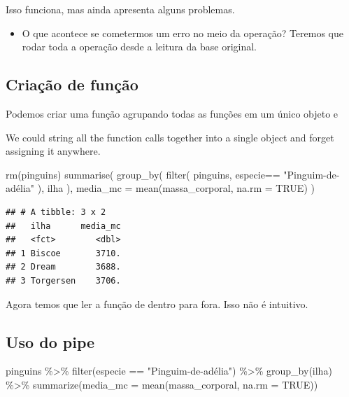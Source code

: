 \documentclass[
]{book}
\newenvironment{Shaded}{\begin{snugshade}}{\end{snugshade}}
\newcommand{\AttributeTok}[1]{\textcolor[rgb]{0.77,0.63,0.00}{#1}}
\newcommand{\ConstantTok}[1]{\textcolor[rgb]{0.00,0.00,0.00}{#1}}
\newcommand{\FunctionTok}[1]{\textcolor[rgb]{0.00,0.00,0.00}{#1}}
\newcommand{\NormalTok}[1]{#1}
\newcommand{\SpecialCharTok}[1]{\textcolor[rgb]{0.00,0.00,0.00}{#1}}
\newcommand{\StringTok}[1]{\textcolor[rgb]{0.31,0.60,0.02}{#1}}
\providecommand{\tightlist}{%
  \setlength{\itemsep}{0pt}\setlength{\parskip}{0pt}}
\begin{document}
Isso funciona, mas ainda apresenta alguns problemas.

\begin{itemize}
\tightlist
\item
  O que acontece se cometermos um erro no meio da operação? Teremos que rodar
  toda a operação desde a leitura da base original.
\end{itemize}

\hypertarget{criauxe7uxe3o-de-funuxe7uxe3o}{%
\subsection{Criação de função}\label{criauxe7uxe3o-de-funuxe7uxe3o}}

Podemos criar uma função agrupando todas as funções em um único objeto e

We could string all the function calls together into a single object and forget assigning it anywhere.

\begin{Shaded}
\begin{Highlighting}[]
\FunctionTok{rm}\NormalTok{(pinguins)}
\FunctionTok{summarise}\NormalTok{(}
  \FunctionTok{group\_by}\NormalTok{(}
    \FunctionTok{filter}\NormalTok{(}
\NormalTok{      pinguins,}
\NormalTok{      especie}\SpecialCharTok{==} \StringTok{"Pinguim{-}de{-}adélia"}
\NormalTok{    ),}
\NormalTok{    ilha}
\NormalTok{  ),}
  \AttributeTok{media\_mc =} \FunctionTok{mean}\NormalTok{(massa\_corporal, }\AttributeTok{na.rm =} \ConstantTok{TRUE}\NormalTok{)}
\NormalTok{)}
\end{Highlighting}
\end{Shaded}

\begin{verbatim}
## # A tibble: 3 x 2
##   ilha      media_mc
##   <fct>        <dbl>
## 1 Biscoe       3710.
## 2 Dream        3688.
## 3 Torgersen    3706.
\end{verbatim}

Agora temos que ler a função de dentro para fora. Isso não é intuitivo.

\hypertarget{uso-do-pipe}{%
\subsection{Uso do pipe}\label{uso-do-pipe}}

\begin{Shaded}
\begin{Highlighting}[]
\NormalTok{pinguins }\SpecialCharTok{\%\textgreater{}\%}
  \FunctionTok{filter}\NormalTok{(especie }\SpecialCharTok{==} \StringTok{"Pinguim{-}de{-}adélia"}\NormalTok{) }\SpecialCharTok{\%\textgreater{}\%}
  \FunctionTok{group\_by}\NormalTok{(ilha) }\SpecialCharTok{\%\textgreater{}\%}
  \FunctionTok{summarize}\NormalTok{(}\AttributeTok{media\_mc =} \FunctionTok{mean}\NormalTok{(massa\_corporal, }\AttributeTok{na.rm =} \ConstantTok{TRUE}\NormalTok{))}
\end{Highlighting}
\end{Shaded}
\end{document}
